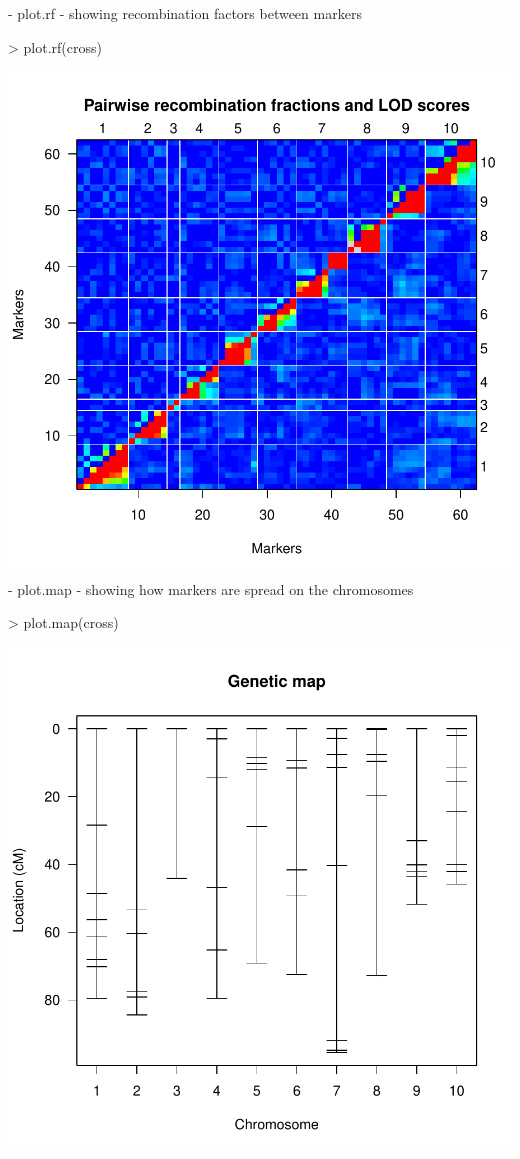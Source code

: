 \documentclass{article}
\begin{document}
{\noindent}- plot.rf - showing recombination factors between markers
\begin{Schunk}
\begin{Sinput}
> plot.rf(cross)
\end{Sinput}
\end{Schunk}
\includegraphics{manual-012}
\newpage
{\noindent}- plot.map - showing how markers are spread on the chromosomes
\begin{Schunk}
\begin{Sinput}
> plot.map(cross)
\end{Sinput}
\end{Schunk}
\includegraphics{manual-013}
\end{document}
